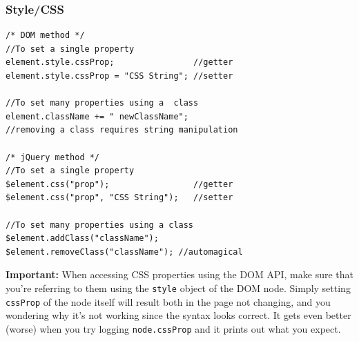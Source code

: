 \documentclass[12pt]{article}
\begin{document}
\subsubsection*{Style/CSS}
\begin{samepage}
\begin{Verbatim}[frame=single]
/* DOM method */
//To set a single property
element.style.cssProp;                //getter
element.style.cssProp = "CSS String"; //setter

//To set many properties using a  class
element.className += " newClassName";
//removing a class requires string manipulation

/* jQuery method */
//To set a single property
$element.css("prop");                 //getter
$element.css("prop", "CSS String");   //setter

//To set many properties using a class
$element.addClass("className");
$element.removeClass("className"); //automagical
\end{Verbatim}
\end{samepage}
\textbf{Important:} When accessing CSS properties using the DOM API, make sure that you're referring to them using the \texttt{style} object of the DOM node. Simply setting \texttt{cssProp} of the node itself will result both in the page not changing, and you wondering why it's not working since the syntax looks correct. It gets even better (worse) when you try logging \texttt{node.cssProp} and it prints out what you expect.
\end{document}
